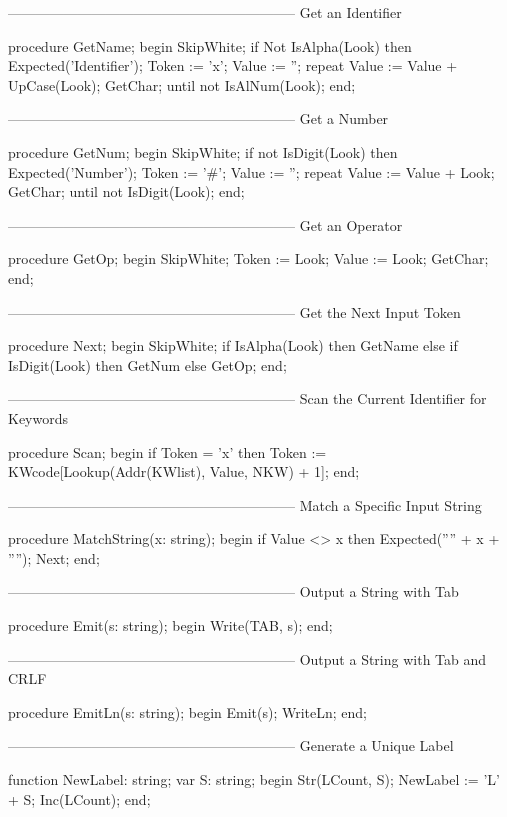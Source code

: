 \documentclass[float=false, crop=false]{standalone}
\begin{document}
\begin{code}
{--------------------------------------------------------------}
{ Get an Identifier }

procedure GetName;
begin
   SkipWhite;
   if Not IsAlpha(Look) then Expected('Identifier');
   Token := 'x';
   Value := '';
   repeat
      Value := Value + UpCase(Look);
      GetChar;
   until not IsAlNum(Look);
end;


{--------------------------------------------------------------}
{ Get a Number }

procedure GetNum;
begin
   SkipWhite;
   if not IsDigit(Look) then Expected('Number');
   Token := '#';
   Value := '';
   repeat
      Value := Value + Look;
      GetChar;
   until not IsDigit(Look);
end;


{--------------------------------------------------------------}
{ Get an Operator }

procedure GetOp;
begin
   SkipWhite;
   Token := Look;
   Value := Look;
   GetChar;
end;


{--------------------------------------------------------------}
{ Get the Next Input Token }

procedure Next;
begin
   SkipWhite;
   if IsAlpha(Look) then GetName
   else if IsDigit(Look) then GetNum
   else GetOp;
end;


{--------------------------------------------------------------}
{ Scan the Current Identifier for Keywords }

procedure Scan;
begin
   if Token = 'x' then
      Token := KWcode[Lookup(Addr(KWlist), Value, NKW) + 1];
end;


{--------------------------------------------------------------}
{ Match a Specific Input String }

procedure MatchString(x: string);
begin
   if Value <> x then Expected('''' + x + '''');
   Next;
end;


{--------------------------------------------------------------}
{ Output a String with Tab }

procedure Emit(s: string);
begin
   Write(TAB, s);
end;


{--------------------------------------------------------------}
{ Output a String with Tab and CRLF }

procedure EmitLn(s: string);
begin
   Emit(s);
   WriteLn;
end;


{--------------------------------------------------------------}
{ Generate a Unique Label }

function NewLabel: string;
var S: string;
begin
   Str(LCount, S);
   NewLabel := 'L' + S;
   Inc(LCount);
end;



\end{code}
\end{document}

